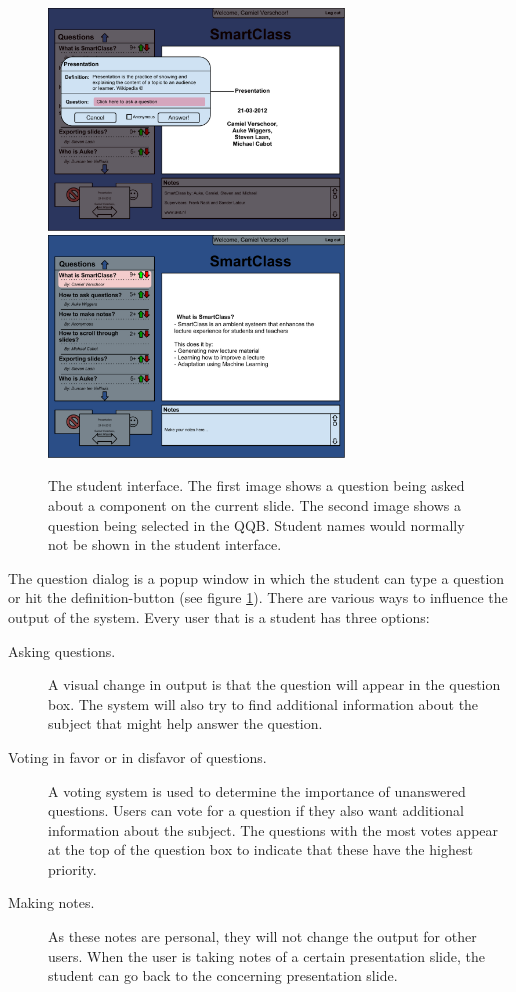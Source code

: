 \documentclass[11pt]{article}
\begin{document}
\begin{figure}[!h]
\centering
\includegraphics[width=0.7\textwidth]{studentInterfaceDialog.pdf}
\includegraphics[width=0.7\textwidth]{studentInterfaceAnswer.pdf}
\caption{The student interface. The first image shows a question being asked about a component on the current slide. The second image shows a question being selected in the QQB. Student names would normally not be shown in the student interface.}
\label{studentInterfaceDialogAnswer}
\end{figure}

The question dialog is a popup window in which the student can type a question or hit the definition-button (see figure \ref{studentInterfaceDialogAnswer}). There are various ways to influence the output of the system. Every user that is a student has three options:
\begin{description}
\item[Asking questions.] A visual change in output is that the question will appear in the question box. The system will also try to find additional information about the subject that might help answer the question.
\item[Voting in favor or in disfavor of questions.] A voting system is used to determine the importance of unanswered questions. Users can vote for a question if they also want additional information about the subject. The questions with the most votes appear at the top of the question box to indicate that these have the highest priority.
\item[Making notes.] As these notes are personal, they will not change the output for other users. When the user is taking notes of a certain presentation slide, the student can go back to the concerning presentation slide.
\end{description}
\end{document}
